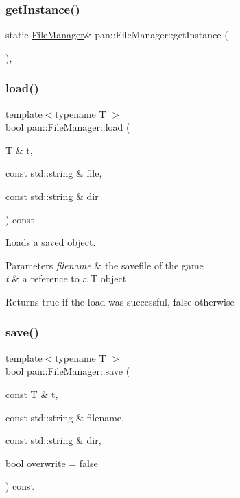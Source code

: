 \subsubsection{\texorpdfstring{get\+Instance()}{getInstance()}}
{\footnotesize\ttfamily static \hyperlink{classpan_1_1_file_manager}{File\+Manager}\& pan\+::\+File\+Manager\+::get\+Instance (\begin{DoxyParamCaption}{ }\end{DoxyParamCaption})\hspace{0.3cm}{\ttfamily [inline]}, {\ttfamily [static]}}

\mbox{\label{classpan_1_1_file_manager_ac0112a350779701a11110042bd053458}} 
\subsubsection{\texorpdfstring{load()}{load()}}
{\footnotesize\ttfamily template$<$typename T $>$ \\
bool pan\+::\+File\+Manager\+::load (\begin{DoxyParamCaption}\item[{T \&}]{t,  }\item[{const std\+::string \&}]{file,  }\item[{const std\+::string \&}]{dir }\end{DoxyParamCaption}) const}

Loads a saved object. 
\begin{DoxyParams}{Parameters}
{\em filename} & the savefile of the game \\
\hline
{\em t} & a reference to a T object \\
\hline
\end{DoxyParams}
\begin{DoxyReturn}{Returns}
true if the load was successful, false otherwise 
\end{DoxyReturn}
\mbox{\label{classpan_1_1_file_manager_ab897366e9055e7e251a67d82b1cefcaa}} 
\subsubsection{\texorpdfstring{save()}{save()}}
{\footnotesize\ttfamily template$<$typename T $>$ \\
bool pan\+::\+File\+Manager\+::save (\begin{DoxyParamCaption}\item[{const T \&}]{t,  }\item[{const std\+::string \&}]{filename,  }\item[{const std\+::string \&}]{dir,  }\item[{bool}]{overwrite = {\ttfamily false} }\end{DoxyParamCaption}) const}

